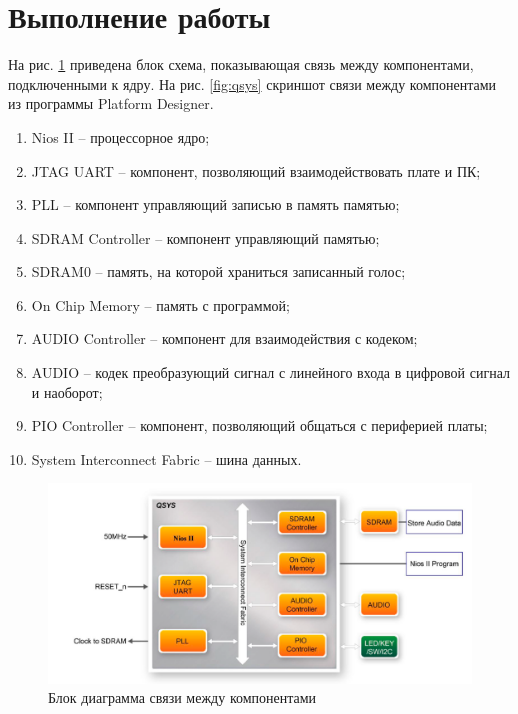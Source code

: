 \documentclass[a4paper,14pt]{article}
\begin{document}
	\section{Выполнение работы}
	
	На рис. \ref{fig:shemeqsys} приведена блок схема, показывающая связь между компонентами, подключенными к ядру.
	На рис. \ref{fig:qsys} скриншот связи между компонентами из программы Platform Designer.
	
	\begin{enumerate}
		
		\item Nios II -- процессорное ядро;
		
		\item JTAG UART -- компонент, позволяющий взаимодействовать плате и ПК;
		
		\item PLL -- компонент управляющий записью в память памятью;
		
		\item SDRAM Controller -- компонент управляющий памятью;
		
		\item SDRAM0 -- память, на которой храниться записанный голос;
		
		\item On Chip Memory -- память с программой;
		 
		\item AUDIO Controller -- компонент для взаимодействия с кодеком;
		
		\item AUDIO -- кодек преобразующий сигнал с линейного входа в цифровой сигнал и наоборот;
		
		\item PIO Controller -- компонент, позволяющий общаться с периферией платы;
		
		\item System Interconnect Fabric -- шина данных.
		
	\end{enumerate}
	
	\begin{figure}[H]
		\centering
		\includegraphics[width=0.7\linewidth]{images/sheme_qsys}
		\caption{Блок диаграмма связи между компонентами}
		\label{fig:shemeqsys}
	\end{figure}
\end{document}
